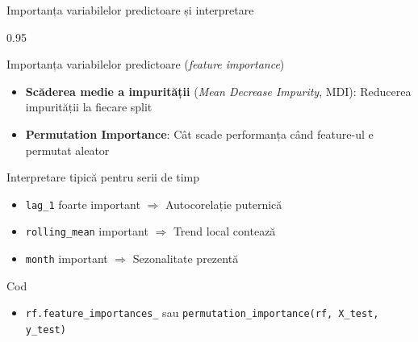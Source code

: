 \documentclass[9pt, aspectratio=169, t]{beamer}
\begin{document}
\begin{frame}{Importanța variabilelor predictoare și interpretare}
    \begin{cminipage}{0.95\textwidth}
        \begin{block}{Importanța variabilelor predictoare (\emph{feature importance})}
            \begin{itemize}\setlength{\itemsep}{0pt}
                \item \textbf{Scăderea medie a impurității} (\emph{Mean Decrease Impurity}, MDI): Reducerea impurității la fiecare split
                \item \textbf{Permutation Importance}: Cât scade performanța când feature-ul e permutat aleator
            \end{itemize}
        \end{block}

        \vspace{0.2cm}

        \begin{block}{Interpretare tipică pentru serii de timp}
            \begin{itemize}\setlength{\itemsep}{0pt}
                \item \texttt{lag\_1} foarte important $\Rightarrow$ Autocorelație puternică
                \item \texttt{rolling\_mean} important $\Rightarrow$ Trend local contează
                \item \texttt{month} important $\Rightarrow$ Sezonalitate prezentă
            \end{itemize}
        \end{block}

        \vspace{0.2cm}

        {\footnotesize
        \begin{block}{Cod}
            \begin{itemize}\setlength{\itemsep}{0pt}
                \item \texttt{rf.feature\_importances\_} sau \texttt{permutation\_importance(rf, X\_test, y\_test)}
            \end{itemize}
        \end{block}
        }
    \end{cminipage}
\end{frame}
\end{document}
